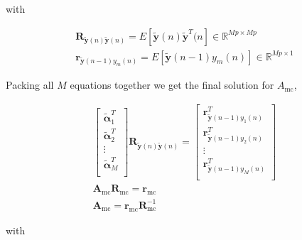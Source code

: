 \noindent
with

\begin{eqnarray}
	\boldsymbol{R}_{\boldsymbol{\tilde{y}}(n)\boldsymbol{\tilde{y}}(n)} = E[\boldsymbol{\tilde{y}}(n) \boldsymbol{\tilde{y}}^T(n] \in  \mathbb{R} ^ {Mp \times Mp}\\
	\boldsymbol{r}_{\boldsymbol{\tilde{y}}(n-1)y_m(n)} = E[\boldsymbol{\tilde{y}}(n-1)y_m(n)] \in  \mathbb{R} ^ {Mp \times 1}
\end{eqnarray}

Packing all $M$ equations together we get the final solution for $A_{\mathrm{mc}}$,

\begin{eqnarray}
	\begin{bmatrix}
		\boldsymbol{\tilde{\alpha}}^T_1 \\
		\boldsymbol{\tilde{\alpha}}^T_2 \\
		\vdots \\
		\boldsymbol{\tilde{\alpha}}^T_M \\
	\end{bmatrix}
	\boldsymbol{R}_{\boldsymbol{\tilde{y}}(n)\boldsymbol{\tilde{y}}(n)} =
	\begin{bmatrix}
		\boldsymbol{r}^T_{\boldsymbol{\tilde{y}}(n-1)y_1(n)} \\
		\boldsymbol{r}^T_{\boldsymbol{\tilde{y}}(n-1)y_2(n)}\\
		\vdots \\
		\boldsymbol{r}^T_{\boldsymbol{\tilde{y}}(n-1)y_M(n)} \\
	\end{bmatrix} \\
	\boldsymbol{A}_{\mathrm{mc}}\boldsymbol{R}_{\mathrm{mc}} = \boldsymbol{r}_{\mathrm{mc}} \label{eq:mc_yule_walker} \\
	\boldsymbol{A}_{\mathrm{mc}} = \boldsymbol{r}_{\mathrm{mc}} \boldsymbol{R}_{\mathrm{mc}}^{-1}
\end{eqnarray}

\noindent
with

